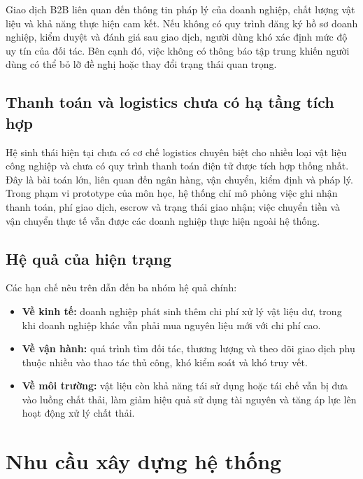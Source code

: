 \documentclass[12pt,a4paper,oneside]{report}
\begin{document}
Giao dịch B2B liên quan đến thông tin pháp lý của doanh nghiệp, chất lượng vật
liệu và khả năng thực hiện cam kết. Nếu không có quy trình đăng ký hồ sơ doanh
nghiệp, kiểm duyệt và đánh giá sau giao dịch, người dùng khó xác định mức độ uy
tín của đối tác. Bên cạnh đó, việc không có thông báo tập trung khiến người dùng
có thể bỏ lỡ đề nghị hoặc thay đổi trạng thái quan trọng.

\subsection{Thanh toán và logistics chưa có hạ tầng tích hợp}

Hệ sinh thái hiện tại chưa có cơ chế logistics chuyên biệt cho nhiều loại vật
liệu công nghiệp và chưa có quy trình thanh toán điện tử được tích hợp thống
nhất. Đây là bài toán lớn, liên quan đến ngân hàng, vận chuyển, kiểm định và pháp
lý. Trong phạm vi prototype của môn học, hệ thống chỉ mô phỏng việc ghi nhận
thanh toán, phí giao dịch, escrow và trạng thái giao nhận; việc chuyển tiền và
vận chuyển thực tế vẫn được các doanh nghiệp thực hiện ngoài hệ thống.

\subsection{Hệ quả của hiện trạng}

Các hạn chế nêu trên dẫn đến ba nhóm hệ quả chính:

\begin{itemize}[leftmargin=1.1cm]
  \item \textbf{Về kinh tế:} doanh nghiệp phát sinh thêm chi phí xử lý vật liệu
  dư, trong khi doanh nghiệp khác vẫn phải mua nguyên liệu mới với chi phí cao.

  \item \textbf{Về vận hành:} quá trình tìm đối tác, thương lượng và theo dõi
  giao dịch phụ thuộc nhiều vào thao tác thủ công, khó kiểm soát và khó truy vết.

  \item \textbf{Về môi trường:} vật liệu còn khả năng tái sử dụng hoặc tái chế
  vẫn bị đưa vào luồng chất thải, làm giảm hiệu quả sử dụng tài nguyên và tăng áp
  lực lên hoạt động xử lý chất thải.
\end{itemize}

\section{Nhu cầu xây dựng hệ thống}
\label{sec:nhu-cau}
\end{document}

